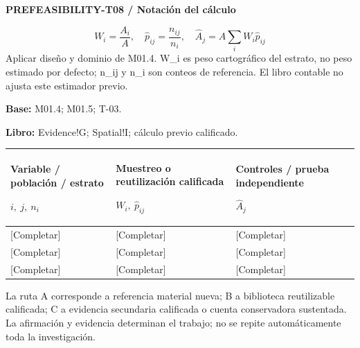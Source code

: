 \par\begingroup\sffamily\fontsize{8}{10}\selectfont\color{NEBGreen}\setlength{\parskip}{2pt}\setlength{\abovedisplayskip}{4pt}\setlength{\belowdisplayskip}{4pt}\setlength{\abovedisplayshortskip}{2pt}\setlength{\belowdisplayshortskip}{3pt}
\textbf{PREFEASIBILITY-T08 / Notación del cálculo}\par
{\fontsize{9}{11}\selectfont\[ W_i=\frac{A_i}{A},\quad \widehat p_{ij}=\frac{n_{ij}}{n_i},\quad \widehat A_j=A\sum_i W_i\widehat p_{ij} \]}
Aplicar diseño y dominio de M01.4. W\_i es peso cartográfico del estrato, no peso estimado por defecto; n\_ij y n\_i son conteos de referencia. El libro contable no ajusta este estimador previo.\par
\textbf{Base:} M01.4; M01.5; T-03.\par
\textbf{Libro:} Evidence!G; Spatial!I; cálculo previo calificado.\par\endgroup
{\sffamily\fontsize{8.3}{10.3}\selectfont\begin{longtable}{@{}P{52.79mm} P{56.09mm} P{56.09mm}@{}}
\toprule
\textbf{Variable / población / estrato}\par {\normalfont\fontsize{8.2}{10}\selectfont $i,\ j,\ n_i$} & \textbf{Muestreo o reutilización calificada}\par {\normalfont\fontsize{8.2}{10}\selectfont $W_i,\ \widehat p_{ij}$} & \textbf{Controles / prueba independiente}\par {\normalfont\fontsize{8.2}{10}\selectfont $\widehat A_j$}\\\midrule\endhead
\rule{0pt}{7.7mm}[Completar] & [Completar] & [Completar]\\\hline
\rule{0pt}{7.7mm}[Completar] & [Completar] & [Completar]\\\hline
\rule{0pt}{7.7mm}[Completar] & [Completar] & [Completar]\\\hline
\end{longtable}}
\begin{Notice}La ruta A corresponde a referencia material nueva; B a biblioteca reutilizable calificada; C a evidencia secundaria calificada o cuenta conservadora sustentada. La afirmación y evidencia determinan el trabajo; no se repite automáticamente toda la investigación.\end{Notice}
